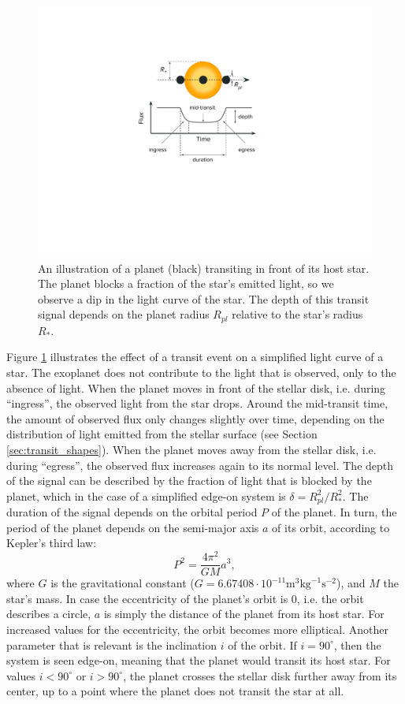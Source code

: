 \begin{figure}
    \centering
    \includegraphics[width=0.4\linewidth]{Background/Figures/transit_drawing.pdf}
    \caption{An illustration of a planet (black) transiting in front of its host star. The planet blocks a fraction of the star's emitted light, so we observe a dip in the light curve of the star. The depth of this transit signal depends on the planet radius $R_{pl}$ relative to the star's radius $R_*$.}
    \label{fig:transit}
\end{figure}

Figure \ref{fig:transit} illustrates the effect of a transit event on a simplified light curve of a star. The exoplanet does not contribute to the light that is observed, only to the absence of light. When the planet moves in front of the stellar disk, i.e. during ``ingress'', the observed light from the star drops. Around the mid-transit time, the amount of observed flux only changes slightly over time, depending on the distribution of light emitted from the stellar surface (see Section \ref{sec:transit_shapes}). When the planet moves away from the stellar disk, i.e. during ``egress'', the observed flux increases again to its normal level. The depth of the signal can be described by the fraction of light that is blocked by the planet, which in the case of a simplified edge-on system is $\delta = R_{pl}^2 / R_*^2$. The duration of the signal depends on the orbital period $P$ of the planet. In turn, the period of the planet depends on the semi-major axis $a$ of its orbit, according to Kepler's third law:
\begin{equation}
    \label{eq:kepler}
    P^2 = \frac{4 \pi^2}{GM}  a^3,
\end{equation}
where $G$ is the gravitational constant ($G=6.67408 \cdot 10^{-11} \text{m}^3 \text{kg}^{-1} \text{s}^{-2}$), and $M$ the star’s mass.
In case the eccentricity of the planet's orbit is 0, i.e. the orbit describes a circle, $a$ is simply the distance of the planet from its host star. For increased values for the eccentricity, the orbit becomes more elliptical. Another parameter that is relevant is the inclination $i$ of the orbit. If $i=90^\circ$, then the system is seen edge-on, meaning that the planet would transit its host star. For values $i < 90^\circ$ or $i > 90^\circ$, the planet crosses the stellar disk further away from its center, up to a point where the planet does not transit the star at all.

